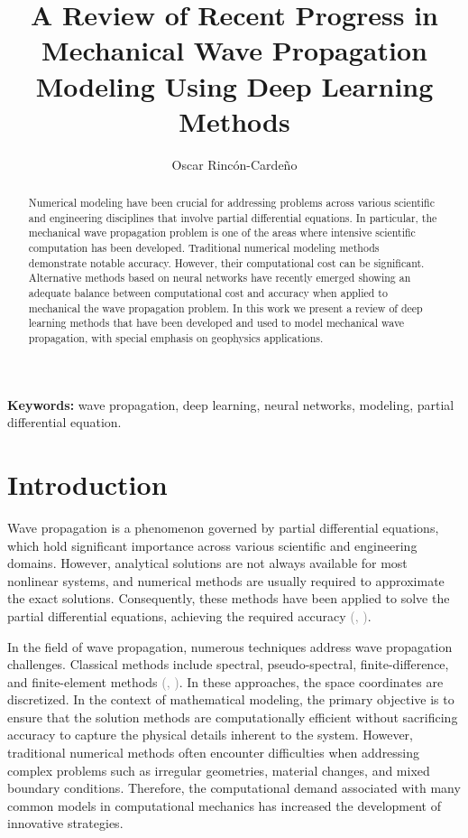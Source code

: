 \documentclass{tufte-handout}
\title[Modeling of Mechanical Wave Propagation]{A Review of Recent Progress in Mechanical Wave Propagation Modeling Using Deep Learning Methods}
\author[Oscar Rincón-Cardeño]{Oscar Rincón-Cardeño}
\providecommand{\keywords}[1]
{
  \small	
  \textbf{{Keywords:}} #1
}
\renewcommand{\citep}[2][]{\textcolor{gray}{(\citeauthor{#2}, \citeyear[#1]{#2})}}
\begin{document}
\maketitle

\begin{abstract}
\noindent
Numerical modeling have been crucial for addressing problems across various scientific and engineering disciplines that involve partial differential equations. In particular, the mechanical wave propagation problem is one of the areas where intensive scientific computation has been developed. Traditional numerical modeling methods demonstrate notable accuracy. However, their computational cost can be significant. Alternative methods based on neural networks have recently emerged showing an adequate balance between computational cost and accuracy when applied to mechanical the wave propagation problem. In this work we present a review of deep learning methods that have been developed and used to model mechanical wave propagation, with special emphasis on geophysics applications.
\end{abstract}
\keywords{wave propagation, deep learning, neural networks, modeling, partial differential equation.}

\section{Introduction}

Wave propagation is a phenomenon governed by partial differential equations, which hold significant importance across various scientific and engineering domains. However, analytical solutions are not always available for most nonlinear systems, and numerical methods are usually required to approximate the exact solutions. Consequently, these methods have been applied to solve the partial differential equations, achieving the required accuracy \citep{Seriani2020}.

In the field of wave propagation, numerous techniques address wave propagation challenges. Classical methods include spectral, pseudo-spectral, finite-difference, and finite-element methods \citep{Moczo, virieux_review_2011, Igel2017}. In these approaches, the space coordinates are discretized. In the context of mathematical modeling, the primary objective is to ensure that the solution methods are computationally efficient without sacrificing accuracy to capture the physical details inherent to the system. However, traditional numerical methods often encounter difficulties when addressing complex problems such as irregular geometries, material changes, and mixed boundary conditions. Therefore, the computational demand associated with many common models in computational mechanics has increased the development of innovative strategies.
\end{document}
